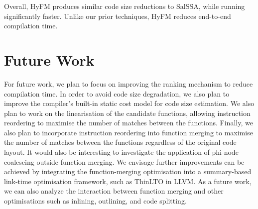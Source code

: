 Overall, HyFM produces similar code size reductions to SalSSA, while running significantly faster.
Unlike our prior techniques, HyFM reduces end-to-end compilation time.

\section{Future Work} \label{sec:conclusion:futurework}

For future work, we plan to focus on improving the ranking mechanism to reduce compilation time.
In order to avoid code size degradation, we also plan to improve the compiler's built-in static cost model for code size estimation.
We also plan to work on the linearisation of the candidate functions, allowing instruction reordering to maximise the number of matches between the functions.
Finally, we also plan to incorporate instruction reordering into function merging to maximise the number of matches between the functions regardless of the original code layout.
It would also be interesting to investigate the application of phi-node coalescing outside function merging.
We envisage further improvements can be achieved by integrating the function-merging optimisation into a summary-based  link-time optimisation framework, such as ThinLTO in LLVM.
As a future work, we can also analyze the interaction between function merging and other optimisations such as inlining, outlining, and code splitting.



